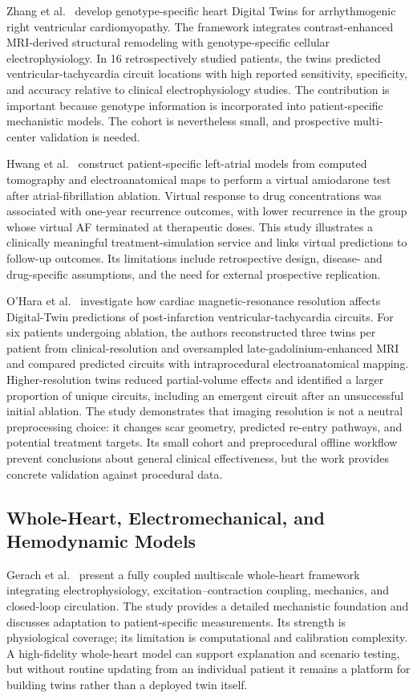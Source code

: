 Zhang et al.~\cite{zhang2023genotype} develop genotype-specific heart Digital Twins for arrhythmogenic right ventricular cardiomyopathy. The framework integrates contrast-enhanced MRI-derived structural remodeling with genotype-specific cellular electrophysiology. In 16 retrospectively studied patients, the twins predicted ventricular-tachycardia circuit locations with high reported sensitivity, specificity, and accuracy relative to clinical electrophysiology studies. The contribution is important because genotype information is incorporated into patient-specific mechanistic models. The cohort is nevertheless small, and prospective multi-center validation is needed.

Hwang et al.~\cite{hwang2024amiodarone} construct patient-specific left-atrial models from computed tomography and electroanatomical maps to perform a virtual amiodarone test after atrial-fibrillation ablation. Virtual response to drug concentrations was associated with one-year recurrence outcomes, with lower recurrence in the group whose virtual AF terminated at therapeutic doses. This study illustrates a clinically meaningful treatment-simulation service and links virtual predictions to follow-up outcomes. Its limitations include retrospective design, disease- and drug-specific assumptions, and the need for external prospective replication.

O'Hara et al.~\cite{ohara2024mri} investigate how cardiac magnetic-resonance resolution affects Digital-Twin predictions of post-infarction ventricular-tachycardia circuits. For six patients undergoing ablation, the authors reconstructed three twins per patient from clinical-resolution and oversampled late-gadolinium-enhanced MRI and compared predicted circuits with intraprocedural electroanatomical mapping. Higher-resolution twins reduced partial-volume effects and identified a larger proportion of unique circuits, including an emergent circuit after an unsuccessful initial ablation. The study demonstrates that imaging resolution is not a neutral preprocessing choice: it changes scar geometry, predicted re-entry pathways, and potential treatment targets. Its small cohort and preprocedural offline workflow prevent conclusions about general clinical effectiveness, but the work provides concrete validation against procedural data.

\subsection{Whole-Heart, Electromechanical, and Hemodynamic Models}
Gerach et al.~\cite{gerach2021electromechanical} present a fully coupled multiscale whole-heart framework integrating electrophysiology, excitation--contraction coupling, mechanics, and closed-loop circulation. The study provides a detailed mechanistic foundation and discusses adaptation to patient-specific measurements. Its strength is physiological coverage; its limitation is computational and calibration complexity. A high-fidelity whole-heart model can support explanation and scenario testing, but without routine updating from an individual patient it remains a platform for building twins rather than a deployed twin itself.

